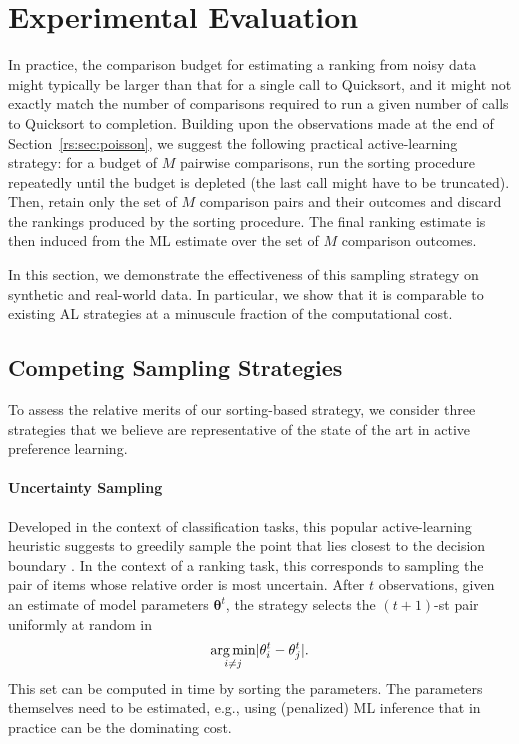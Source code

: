 \section{Experimental Evaluation}  %
\label{rs:sec:experiments}

In practice, the comparison budget for estimating a ranking from noisy data might typically be larger than that for a single call to Quicksort, and it might not exactly match the number of comparisons required to run a given number of calls to Quicksort to completion.
Building upon the observations made at the end of Section~\ref{rs:sec:poisson}, we suggest the following practical active-learning strategy:
for a budget of $M$ pairwise comparisons, run the sorting procedure repeatedly until the budget is depleted (the last call might have to be truncated).
Then, retain only the set of $M$ comparison pairs and their outcomes and discard the rankings produced by the sorting procedure.
The final ranking estimate is then induced from the ML estimate over the set of $M$ comparison outcomes.

In this section, we demonstrate the effectiveness of this sampling strategy on synthetic and real-world data.
In particular, we show that it is comparable to existing AL strategies at a minuscule fraction of the computational cost.


\subsection{Competing Sampling Strategies}

To assess the relative merits of our sorting-based strategy, we consider three strategies that we believe are representative of the state of the art in active preference learning.

\paragraph{Uncertainty Sampling}
Developed in the context of classification tasks, this popular active-learning heuristic suggests to greedily sample the point that lies closest to the decision boundary \citep{settles2012active}.
In the context of a ranking task, this corresponds to sampling the pair of items whose relative order is most uncertain.
After $t$ observations, given an estimate of model parameters $\bm{\theta}^t$, the strategy selects the $(t\!+\!1)$-st pair uniformly at random in
\begin{align*}
\operatorname*{arg\,min}_{i \ne j} \lvert\theta^t_i - \theta^t_j\rvert.
\end{align*}
This set can be computed in time  by sorting the parameters.
The parameters themselves need to be estimated, e.g., using (penalized) ML inference that in practice can be the dominating cost.

